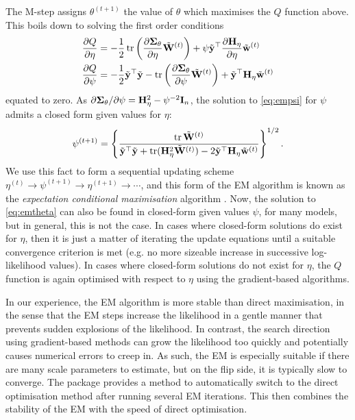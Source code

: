 The M-step assigns $\theta^{(t+1)}$ the value of $\theta$ which maximises the $Q$ function above.
This boils down to solving the first order conditions
\begin{align}
  \frac{\partial Q}{\partial\eta}
  &= -\frac{1}{2} \operatorname{tr} \left(\frac{\partial {\bm\Sigma}_\theta}{\partial\eta} \tilde{{\mathbf W}}^{(t)} \right) + \psi \tilde{{\mathbf y}} ^\top \frac{\partial {\mathbf H}_\eta}{\partial\eta} \tilde{{\mathbf w}}^{(t)} \label{eq:emtheta} \\
  \frac{\partial Q}{\partial\psi}
  &= -\frac{1}{2} \tilde{{\mathbf y}}^\top\tilde{{\mathbf y}} - \operatorname{tr} \left(\frac{\partial {\bm\Sigma}_\theta}{\partial\psi} \tilde{{\mathbf W}}^{(t)} \right) + \tilde{{\mathbf y}}^\top {\mathbf H}_\eta \tilde{{\mathbf w}}^{(t)} \label{eq:empsi}
\end{align}
equated to zero.
As $\partial{\bm\Sigma}_\theta/\partial\psi = {\mathbf H}_\eta^2 - \psi^{-2}{\mathbf I}_n$, the solution to \cref{eq:empsi} for $\psi$ admits a closed form given values for $\eta$:
\begin{align}\label{eq:closedformpsi}
  \psi^{(t+1)} = 
  \left\{ \frac{\operatorname{tr} \tilde{\mathbf W}^{(t)}}{\tilde{{\mathbf y}}^\top\tilde{{\mathbf y}} + \operatorname{tr}({\mathbf H}_\eta^2\tilde{\mathbf W}^{(t)}) - 2\tilde{{\mathbf y}}^\top{\mathbf H}_\eta\tilde{\mathbf w}^{(t)}} \right\}^{1/2}.
\end{align}
We use this fact to form a sequential updating scheme $\eta^{(t)} \to \psi^{(t+1)} \to \eta^{(t+1)} \to \cdots$, and this form of the EM algorithm is known as the \emph{expectation conditional maximisation} algorithm \citep{meng1993maximum}.
Now, the solution to \cref{eq:emtheta} can also be found in closed-form given values $\psi$, for many models, but in general, this is not the case. 
In cases where closed-form solutions do exist for $\eta$, then it is just a matter of iterating the update equations until a suitable convergence criterion is met (e.g. no more sizeable increase in successive log-likelihood values).
In cases where closed-form solutions do not exist for $\eta$, the $Q$ function is again optimised with respect to $\eta$ using the gradient-based algorithms.

In our experience, the EM algorithm is more stable than direct maximisation, in the sense that the EM steps increase the likelihood in a gentle manner that prevents sudden explosions of the likelihood.
In contrast, the search direction using gradient-based methods can grow the likelihood too quickly and potentially causes numerical errors to creep in.
As such, the EM is especially suitable if there are many scale parameters to estimate, but on the flip side, it is typically slow to converge.
The  package provides a method to automatically switch to the direct optimisation method after running several EM iterations.
This then combines the stability of the EM with the speed of direct optimisation.

